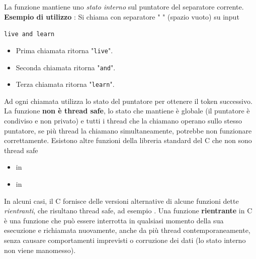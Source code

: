 \documentclass[10pt, letterpaper]{report}
\begin{document}
La funzione mantiene uno \textit{stato interno} sul puntatore del separatore corrente.\acc 
\textbf{Esempio di utilizzo} : Si chiama  con separatore " " (spazio vuoto) su input \begin{center}
    \texttt{live and learn}
\end{center}
\begin{itemize}
    \item Prima chiamata  ritorna "\texttt{live}".
    \item Seconda chiamata  ritorna "\texttt{and}".
    \item Terza chiamata  ritorna "\texttt{learn}".
\end{itemize}
Ad ogni chiamata utilizza lo stato del puntatore per ottenere il token successivo. La funzione \textbf{non è thread safe}, lo stato che mantiene è globale (il puntatore è condiviso e non privato) e tutti i thread che la chiamano operano sullo stesso puntatore, se più thread la chiamano simultaneamente, potrebbe non funzionare correttamente.\acc 
Esistono altre funzioni della libreria standard del C che non sono thread safe\begin{itemize}
    \item {} in 
    \item {} in  
\end{itemize}
In alcuni casi, il C fornisce delle versioni alternative di alcune funzioni dette \textit{rientranti}, che risultano thread safe, ad esempio . \acc 
{} Una funzione \textbf{rientrante} in C è una funzione che può essere interrotta in qualsiasi momento della sua esecuzione e richiamata nuovamente, anche da più thread contemporaneamente, senza causare comportamenti imprevisti o corruzione dei dati (lo stato interno non viene manomesso).
\flowerLine 
\end{document}

